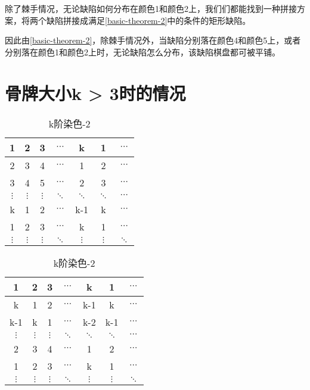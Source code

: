 除了棘手情况，无论缺陷如何分布在颜色1和颜色2上，我们们都能找到一种拼接方案，将两个缺陷拼接成满足\ref*{basic-theorem-2}中的条件的矩形缺陷。

因此由\ref*{basic-theorem-2}，除棘手情况外，当缺陷分别落在颜色4和颜色5上，或者分别落在颜色1和颜色2上时，无论缺陷怎么分布，该缺陷棋盘都可被平铺。

\section{骨牌大小k > 3时的情况}

\begin{table}[h]
	\caption{k阶染色}
	\label{fig:k-order-staining}
	\begin{subtable}{.5\linewidth}
		\centering
		\caption{k阶染色-1}
		\begin{tabular}{|c|c|c|c|c|c|c|}
			\hline
			1        & 2        & 3        & $\cdots$ & k        & 1        & $\cdots$ \\
			\hline
			2        & 3        & 4        & $\cdots$ & 1        & 2        & $\cdots$ \\
			\hline
			3        & 4        & 5        & $\cdots$ & 2        & 3        & $\cdots$ \\
			\hline
			$\vdots$ & $\vdots$ & $\vdots$ & $\ddots$ & $\ddots$ & $\ddots$ & $\cdots$ \\
			\hline
			k        & 1        & 2        & $\cdots$ & k-1      & k        & $\cdots$ \\
			\hline
			1        & 2        & 3        & $\cdots$ & k        & 1        & $\cdots$ \\
			\hline
			$\vdots$ & $\vdots$ & $\vdots$ & $\ddots$ & $\vdots$ & $\vdots$ & $\ddots$ \\
			\hline
		\end{tabular}
		\label{fig:k-order-staining-1}
	\end{subtable}%
	\begin{subtable}{.5\linewidth}
		\centering
		\caption{k阶染色-2}
		\begin{tabular}{|c|c|c|c|c|c|c|}
			\hline
			1        & 2        & 3        & $\cdots$ & k        & 1        & $\cdots$ \\
			\hline
			k        & 1        & 2        & $\cdots$ & k-1      & k        & $\cdots$ \\
			\hline
			k-1      & k        & 1        & $\cdots$ & k-2      & k-1      & $\cdots$ \\
			\hline
			$\vdots$ & $\vdots$ & $\vdots$ & $\ddots$ & $\ddots$ & $\ddots$ & $\cdots$ \\
			\hline
			2        & 3        & 4        & $\cdots$ & 1        & 2        & $\cdots$ \\
			\hline
			1        & 2        & 3        & $\cdots$ & k        & 1        & $\cdots$ \\
			\hline
			$\vdots$ & $\vdots$ & $\vdots$ & $\ddots$ & $\vdots$ & $\vdots$ & $\ddots$ \\
			\hline
		\end{tabular}
		\label{fig:k-order-staining-2}
	\end{subtable}
\end{table}

